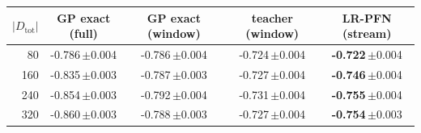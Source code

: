 \begin{tabular}{r cccc}
\toprule
$|D_{\mathrm{tot}}|$ & GP exact (full) & GP exact (window) & teacher (window) & LR-PFN (stream)\\
\midrule
80 & -0.786\,{\scriptsize$\pm$0.004} & -0.786\,{\scriptsize$\pm$0.004} & -0.724\,{\scriptsize$\pm$0.004} & \textbf{-0.722}\,{\scriptsize$\pm$0.004}\\
160 & -0.835\,{\scriptsize$\pm$0.003} & -0.787\,{\scriptsize$\pm$0.003} & -0.727\,{\scriptsize$\pm$0.004} & \textbf{-0.746}\,{\scriptsize$\pm$0.004}\\
240 & -0.854\,{\scriptsize$\pm$0.003} & -0.792\,{\scriptsize$\pm$0.004} & -0.731\,{\scriptsize$\pm$0.004} & \textbf{-0.755}\,{\scriptsize$\pm$0.004}\\
320 & -0.860\,{\scriptsize$\pm$0.003} & -0.788\,{\scriptsize$\pm$0.003} & -0.727\,{\scriptsize$\pm$0.004} & \textbf{-0.754}\,{\scriptsize$\pm$0.003}\\
\bottomrule
\end{tabular}
